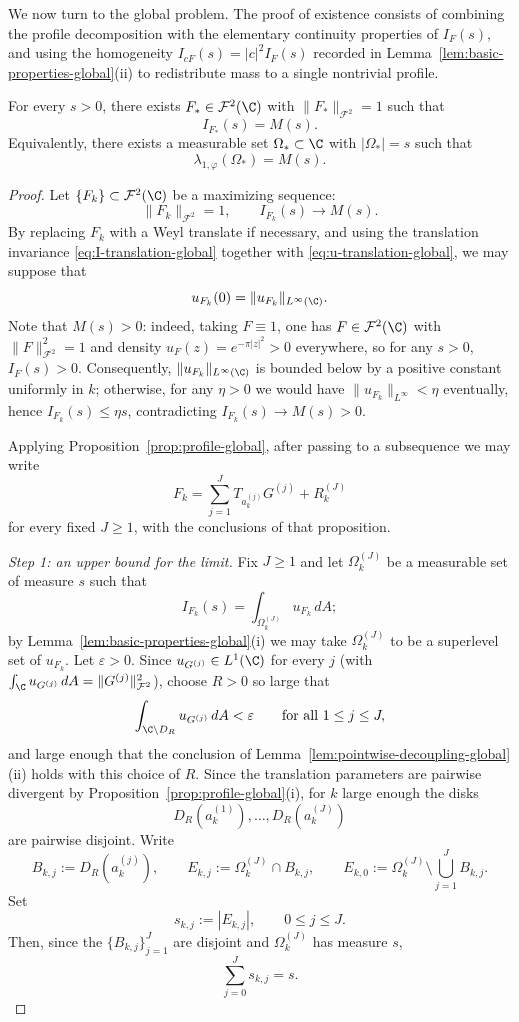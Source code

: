 We now turn to the global problem. The proof of existence consists of
combining the profile decomposition with the elementary continuity properties
of \(I_F(s)\), and using the homogeneity \(I_{cF}(s)=|c|^2 I_F(s)\) recorded
in Lemma~\ref{lem:basic-properties-global}(ii) to redistribute mass to a
single nontrivial profile.

\begin{theorem}\label{thm:existence-global-maximizer}
For every \(s>0\), there exists \(F_*\in \mathcal F^2(\C)\) with
\(\|F_*\|_{\mathcal F^2}=1\) such that
\[
I_{F_*}(s)=M(s).
\]
Equivalently, there exists a measurable set \(\Omega_*\subset \C\) with
\(|\Omega_*|=s\) such that
\[
\lambda_{1,\varphi}(\Omega_*)=M(s).
\]
\end{theorem}

\begin{proof}
Let \(\{F_k\}\subset \mathcal F^2(\C)\) be a maximizing sequence:
\[
\|F_k\|_{\mathcal F^2}=1,
\qquad
I_{F_k}(s)\to M(s).
\]
By replacing \(F_k\) with a Weyl translate if necessary, and using the
translation invariance \eqref{eq:I-translation-global} together with
\eqref{eq:u-translation-global}, we may suppose that
\[
u_{F_k}(0)=\|u_{F_k}\|_{L^\infty(\C)}.
\]
Note that \(M(s)>0\): indeed, taking \(F\equiv 1\), one has
\(F\in \mathcal F^2(\C)\) with \(\|F\|_{\mathcal F^2}^2=1\) and density
\(u_F(z)=e^{-\pi |z|^2}>0\) everywhere, so for any \(s>0\), \(I_F(s)>0\).
Consequently, \(\|u_{F_k}\|_{L^\infty(\C)}\) is bounded below by a positive
constant uniformly in \(k\); otherwise, for any \(\eta>0\) we would have
\(\|u_{F_k}\|_{L^\infty}<\eta\) eventually, hence \(I_{F_k}(s)\le \eta s\),
contradicting \(I_{F_k}(s)\to M(s)>0\).

Applying Proposition~\ref{prop:profile-global}, after passing to a
subsequence we may write
\[
F_k=\sum_{j=1}^J T_{a_k^{(j)}}G^{(j)}+R_k^{(J)}
\]
for every fixed \(J\ge 1\), with the conclusions of that proposition.

\medskip
\noindent\emph{Step 1: an upper bound for the limit.}
Fix \(J\ge 1\) and let \(\Omega_k^{(J)}\) be a measurable set of measure
\(s\) such that
\[
I_{F_k}(s)=\int_{\Omega_k^{(J)}} u_{F_k}\,dA;
\]
by Lemma~\ref{lem:basic-properties-global}(i) we may take
\(\Omega_k^{(J)}\) to be a superlevel set of \(u_{F_k}\). Let
\(\varepsilon>0\). Since \(u_{G^{(j)}}\in L^1(\C)\) for every \(j\) (with
\(\int_\C u_{G^{(j)}}\,dA=\|G^{(j)}\|_{\mathcal F^2}^2\)), choose \(R>0\) so
large that
\[
\int_{\C\setminus D_R} u_{G^{(j)}}\,dA<\varepsilon
\qquad\text{for all } 1\le j\le J,
\]
and large enough that the conclusion of
Lemma~\ref{lem:pointwise-decoupling-global}(ii) holds with this choice of
\(R\). Since the translation parameters are pairwise divergent by
Proposition~\ref{prop:profile-global}(i), for \(k\) large enough the disks
\[
D_R(a_k^{(1)}),\dots,D_R(a_k^{(J)})
\]
are pairwise disjoint. Write
\[
B_{k,j}:=D_R(a_k^{(j)}),
\qquad
E_{k,j}:=\Omega_k^{(J)}\cap B_{k,j},
\qquad
E_{k,0}:=\Omega_k^{(J)}\setminus \bigcup_{j=1}^J B_{k,j}.
\]
Set
\[
s_{k,j}:=|E_{k,j}|,
\qquad 0\le j\le J.
\]
Then, since the \(\{B_{k,j}\}_{j=1}^J\) are disjoint and
\(\Omega_k^{(J)}\) has measure \(s\),
\[
\sum_{j=0}^J s_{k,j}=s.
\]


\end{proof}
